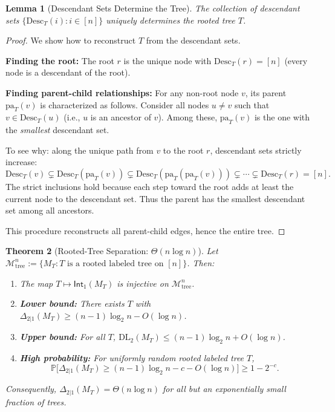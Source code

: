 \documentclass{article}
\theoremstyle{plain}
\newtheorem{theorem}{Theorem}[section]
\newtheorem{lemma}[theorem]{Lemma}
\theoremstyle{definition}
\newcommand{\Prob}{\mathbb{P}}
\newcommand{\calM}{\mathcal{M}}
\newcommand{\Int}{\mathsf{Int}}
\newcommand{\DL}{\mathrm{DL}}
\newcommand{\pa}{\mathrm{pa}}
\newcommand{\Desc}{\mathrm{Desc}}
\begin{document}
\begin{lemma}[Descendant Sets Determine the Tree]
\label{lem:descendants-determine-tree}
The collection of descendant sets $\{\Desc_T(i) : i \in [n]\}$ uniquely determines the rooted tree $T$.
\end{lemma}

\begin{proof}
We show how to reconstruct $T$ from the descendant sets.

\textbf{Finding the root:} The root $r$ is the unique node with $\Desc_T(r) = [n]$ (every node is a descendant of the root).

\textbf{Finding parent-child relationships:} For any non-root node $v$, its parent $\pa_T(v)$ is characterized as follows. Consider all nodes $u \neq v$ such that $v \in \Desc_T(u)$ (i.e., $u$ is an ancestor of $v$). Among these, $\pa_T(v)$ is the one with the \emph{smallest} descendant set.

To see why: along the unique path from $v$ to the root $r$, descendant sets strictly increase:
\[
\Desc_T(v) \subsetneq \Desc_T(\pa_T(v)) \subsetneq \Desc_T(\pa_T(\pa_T(v))) \subsetneq \cdots \subsetneq \Desc_T(r) = [n].
\]
The strict inclusions hold because each step toward the root adds at least the current node to the descendant set. Thus the parent has the smallest descendant set among all ancestors.

This procedure reconstructs all parent-child edges, hence the entire tree.
\end{proof}

\begin{theorem}[Rooted-Tree Separation: $\Theta(n \log n)$]
\label{thm:tree-separation}
Let $\calM_{\mathrm{tree}}^n := \{M_T : T \text{ is a rooted labeled tree on } [n]\}$. Then:
\begin{enumerate}
    \item The map $T \mapsto \Int_1(M_T)$ is injective on $\calM_{\mathrm{tree}}^n$.
    \item \textbf{Lower bound:} There exists $T$ with $\Delta_{2|1}(M_T) \geq (n-1)\log_2 n - O(\log n)$.
    \item \textbf{Upper bound:} For all $T$, $\DL_2(M_T) \leq (n-1)\log_2 n + O(\log n)$.
    \item \textbf{High probability:} For uniformly random rooted labeled tree $T$,
    \[
    \Prob\bigl[\Delta_{2|1}(M_T) \geq (n-1)\log_2 n - c - O(\log n)\bigr] \geq 1 - 2^{-c}.
    \]
\end{enumerate}
Consequently, $\Delta_{2|1}(M_T) = \Theta(n \log n)$ for all but an exponentially small fraction of trees.
\end{theorem}
\end{document}
